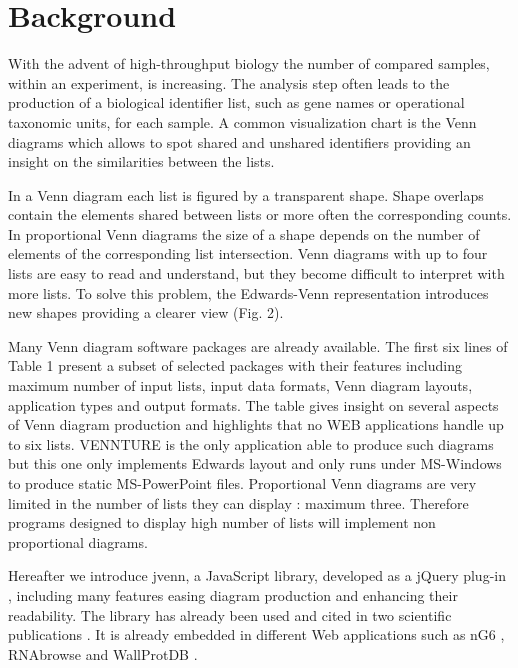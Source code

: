 \documentclass{bmcart}
\begin{document}


\section*{Background}

With the advent of high-throughput biology the number of compared samples,
within an experiment, is increasing. The analysis step often leads to the
production of a biological identifier list, such as gene names or operational
taxonomic units, for each sample. A common visualization chart is the Venn
diagrams \cite{Venn1880} which allows to spot shared and unshared identifiers
providing an insight on the similarities between the lists.

In a Venn diagram each list is figured by a transparent shape. Shape overlaps
contain the elements shared between lists or more often the corresponding counts.
In proportional Venn diagrams the size of a shape depends on the number of
elements of the corresponding list intersection. Venn diagrams with up to four 
lists are easy to read and understand, but they become difficult to interpret
with more lists. To solve this problem, the Edwards-Venn \cite{Edwards2004}
representation introduces new shapes providing a clearer view (Fig. 2).

Many Venn diagram software packages are already available. The first six lines
of Table 1 present a subset of selected packages with their features including 
maximum number of input lists, input data formats, Venn diagram layouts,
application types and output formats. The table gives insight on several aspects
of Venn diagram production and highlights that no WEB applications handle up to
six lists. VENNTURE \cite{Bronwen2012} is the only application able to
produce such diagrams but this one only implements Edwards layout and only runs
under MS-Windows to produce static MS-PowerPoint files. Proportional Venn
diagrams are very limited in the number of lists they can display : maximum
three. Therefore programs designed to display high number of lists will
implement non proportional diagrams.

Hereafter we introduce jvenn, a JavaScript library, developed as a jQuery
plug-in \cite{jquery}, including many features easing diagram production and
enhancing their readability. The library has already been used and cited in two
scientific publications \cite{Bianchia2013, Aravindraja2013}. It is already
embedded in different Web applications such as nG6 \cite{Mariette2012},
RNAbrowse \cite{Mariette} and WallProtDB \cite{SanClemente}.
\end{document}
